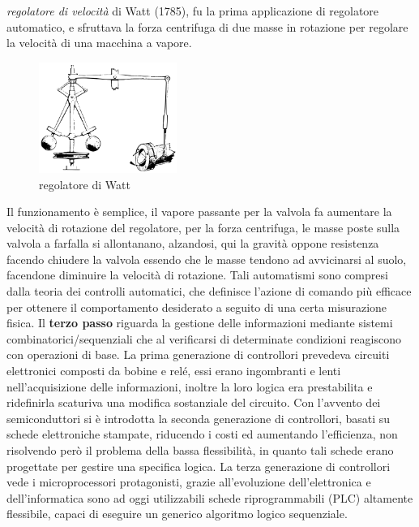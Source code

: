 \documentclass[10pt, letterpaper]{report}
\begin{document}
\textit{regolatore di velocità} di Watt (1785), fu la prima applicazione di regolatore automatico, e sfruttava 
la forza centrifuga di due masse in rotazione per regolare la velocità di una macchina a vapore.
\begin{figure}[h!]
    \centering
    \includegraphics[width=0.4\textwidth ]{images/watt.pdf}
    \caption{regolatore di Watt}
    \label{fig:watt}
\end{figure} \acc
Il funzionamento è semplice, il vapore passante per la valvola fa aumentare la velocità di rotazione del 
regolatore, per la forza centrifuga, le masse poste sulla valvola a farfalla si allontanano, alzandosi, 
qui la gravità oppone resistenza facendo chiudere la valvola essendo che le masse tendono ad avvicinarsi al 
suolo, facendone diminuire la velocità di rotazione.  
Tali automatismi sono compresi dalla teoria dei controlli automatici, che definisce l'azione di comando più efficace 
per ottenere il comportamento desiderato a seguito di una certa misurazione fisica.\acc
Il \textbf{terzo passo} riguarda la gestione delle informazioni mediante sistemi combinatorici/sequenziali che al 
verificarsi di determinate condizioni reagiscono con operazioni di base. La prima generazione di controllori 
prevedeva circuiti elettronici composti da bobine e relé, essi erano ingombranti e lenti nell'acquisizione 
delle informazioni, inoltre la loro logica era prestabilita e ridefinirla scaturiva una modifica sostanziale 
del circuito. \acc 
Con l'avvento dei semiconduttori si è introdotta la seconda generazione di controllori, basati su schede 
elettroniche stampate, riducendo i costi ed aumentando l'efficienza, non risolvendo però il problema della bassa 
flessibilità, in quanto tali schede erano progettate per gestire una specifica logica. \acc 
La terza generazione di controllori vede i microprocessori protagonisti, grazie all'evoluzione dell'elettronica 
e dell'informatica sono ad oggi utilizzabili schede riprogrammabili (PLC) altamente flessibile, capaci di eseguire 
un generico algoritmo logico sequenziale.
\end{document}
